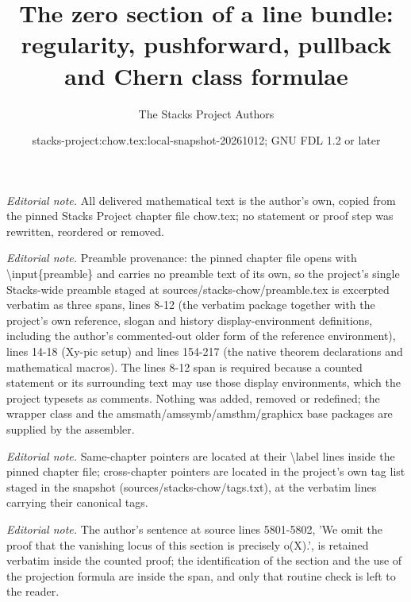 \documentclass[10pt,a4paper]{amsart}
\title{The zero section of a line bundle: regularity, pushforward, pullback and Chern class formulae}
\author{The Stacks Project Authors}
\date{stacks-project:chow.tex:local-snapshot-20261012; GNU FDL 1.2 or later}
\theoremstyle{plain}
\theoremstyle{definition}
\theoremstyle{remark}
\numberwithin{equation}{subsection}
\begin{document}
\maketitle
\noindent\textit{Editorial note.} All delivered mathematical text is the author's own, copied from the pinned Stacks Project chapter file chow.tex; no statement or proof step was rewritten, reordered or removed.\par\medskip
\noindent\textit{Editorial note.} Preamble provenance: the pinned chapter file opens with \textbackslash{}input\{preamble\} and carries no preamble text of its own, so the project's single Stacks-wide preamble staged at sources/stacks-chow/preamble.tex is excerpted verbatim as three spans, lines 8-12 (the verbatim package together with the project's own reference, slogan and history display-environment definitions, including the author's commented-out older form of the reference environment), lines 14-18 (Xy-pic setup) and lines 154-217 (the native theorem declarations and mathematical macros). The lines 8-12 span is required because a counted statement or its surrounding text may use those display environments, which the project typesets as comments. Nothing was added, removed or redefined; the wrapper class and the amsmath/amssymb/amsthm/graphicx base packages are supplied by the assembler.\par\medskip
\noindent\textit{Editorial note.} Same-chapter pointers are located at their \textbackslash{}label lines inside the pinned chapter file; cross-chapter pointers are located in the project's own tag list staged in the snapshot (sources/stacks-chow/tags.txt), at the verbatim lines carrying their canonical tags.\par\medskip
\noindent\textit{Editorial note.} The author's sentence at source lines 5801-5802, 'We omit the proof that the vanishing locus of this section is precisely o(X).', is retained verbatim inside the counted proof; the identification of the section and the use of the projection formula are inside the span, and only that routine check is left to the reader.\par\medskip
\end{document}
